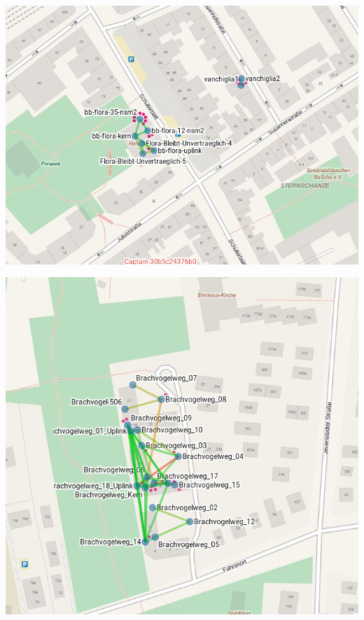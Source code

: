 \documentclass[t]{beamer}
\begin{document}
\begin{frame}{}
    \begin{center}
        \includegraphics[width=.9\textwidth]{Bilder/flora-2015-09-22}
    \end{center}
\end{frame}

\begin{frame}{}
    \begin{center}
        \includegraphics[width=.7\textwidth]{Bilder/brachvogel-2015-09-22}
    \end{center}
\end{frame}
\end{document}
